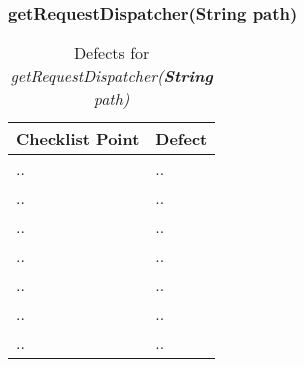 \subsubsection{getRequestDispatcher(String path)}
\begin{table}[htbp]
\begin{center}
\begin{tabular}[t]{p{}p{}}

\hline
\textbf{Checklist Point} & \textbf{Defect} \\
\hline
.. & .. \\
\hline
.. & .. \\
\hline
.. & .. \\
\hline
.. & .. \\
\hline
.. & .. \\
\hline
.. & .. \\
\hline
.. & .. \\
\hline

\end{tabular}
\end{center}
\caption{Defects for \textit{getRequestDispatcher(\textbf{String} path)}}
\end{table}
\clearpage